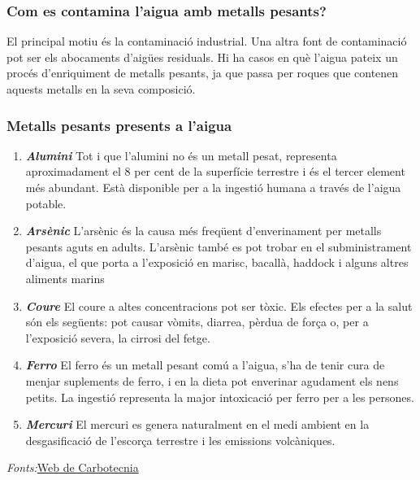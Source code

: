 \subsubsection{Com es contamina l’aigua amb metalls pesants?}
El principal motiu és la contaminació industrial. Una altra font de contaminació pot ser els abocaments d'aigües residuals. Hi ha casos en què l’aigua pateix un procés d’enriquiment de metalls pesants, ja que passa per roques que contenen aquests metalls en la seva composició.
\subsubsection{Metalls pesants presents a l'aigua}
\begin{enumerate}
 \item \textit{\textbf{Alumini}}
 Tot i que l'alumini no és un metall pesat, representa aproximadament el 8 per cent de la superfície terrestre i és el tercer element més abundant. Està disponible per a la ingestió humana a través de l'aigua potable.
 \item \textit{\textbf{Arsènic}}
 L'arsènic és la causa més freqüent d'enverinament per metalls pesants aguts en adults. L'arsènic també es pot trobar en el subministrament d'aigua, el que porta a l'exposició en marisc, bacallà, haddock i alguns altres aliments marins
 \item \textit{\textbf{Coure}}
 El coure a altes concentracions pot ser tòxic. Els efectes per a la salut són els següents: pot causar vòmits, diarrea, pèrdua de força o, per a l'exposició severa, la cirrosi del fetge.
 \item \textit{\textbf{Ferro}}
 El ferro és un metall pesant comú a l'aigua, s'ha de tenir cura de menjar suplements de ferro, i en la dieta pot enverinar agudament els nens petits. La ingestió representa la major intoxicació per ferro per a les persones.
 \item \textit{\textbf{Mercuri}}
 El mercuri es genera naturalment en el medi ambient en la desgasificació de l'escorça terrestre i les emissions volcàniques.
\end{enumerate}
\textit{Fonts:}\href{https://www.carbotecnia.info/aprendizaje/quimica-del-agua/los-metales-pesados-en-el-agua/#:~:text=Regresar\%20arriba-,\%C2\%BFC\%C3\%B3mo\%20se\%20contamina\%20el\%20agua\%20por\%20metales\%20pesados?,estos\%20metales\%20en\%20su\%20composici\%C3\%B3n.}{Web de Carbotecnia}\\
